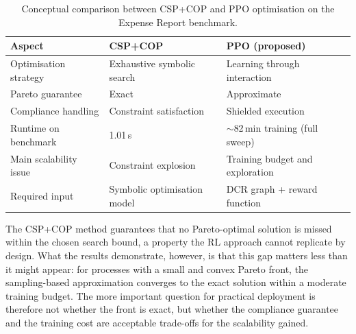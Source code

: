\begin{table}[H]
\centering
\caption{Conceptual comparison between CSP+COP and PPO optimisation
         on the Expense Report benchmark.}
\label{tab:method_comparison}
{\renewcommand{\arraystretch}{1.5}
\begin{tabular}{p{3.5cm} p{5cm} p{5cm}}
\toprule
\textbf{Aspect} & \textbf{CSP+COP} & \textbf{PPO (proposed)} \\
\midrule
Optimisation strategy &
Exhaustive symbolic search &
Learning through interaction \\

\addlinespace
Pareto guarantee &
Exact &
Approximate \\

\addlinespace
Compliance handling &
Constraint satisfaction &
Shielded execution \\

\addlinespace
Runtime on benchmark &
1.01\,s &
$\sim$82\,min training (full sweep) \\

\addlinespace
Main scalability issue &
Constraint explosion &
Training budget and exploration \\

\addlinespace
Required input &
Symbolic optimisation model &
DCR graph + reward function \\

\bottomrule
\end{tabular}}
\end{table}

The CSP+COP method guarantees that no Pareto-optimal solution is missed within the chosen search bound, a property the \ac{RL} approach cannot replicate by design. What the results demonstrate, however, is that this gap matters less than it might appear: for processes with a small and convex Pareto front, the sampling-based approximation converges to the exact solution within a moderate training budget. The more important question for practical deployment is therefore not whether the front is exact, but whether the compliance guarantee and the training cost are acceptable trade-offs for the scalability gained.

